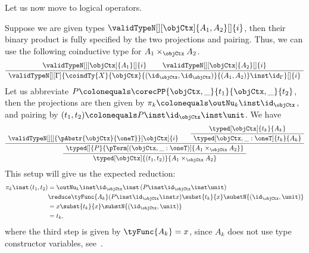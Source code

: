 \documentclass[preprint]{sigplanconf}
\begin{document}
Let us now move to logical operators.
\begin{example}
  Suppose we are given types $\validTypeN[][\objCtx]{A_1, A_2}[]{i}$,
  then their binary product is fully specified by the two projections and
  pairing.
  Thus, we can use the following coinductive type for
  $A_1 \times_{\objCtx} A_2$.
  \begin{gather*}
    \AxiomC{$\validTypeN[][\objCtx]{A_1}[]{i}$}
    \AxiomC{$\validTypeN[][\objCtx]{A_2}[]{i}$}
    \BinaryInfC{$\validTypeN[][\Gamma]{
        \coindTy{X}{\objCtx}{(\id_\objCtx, \id_\objCtx)}{(A_1, A_2)}
        \inst \id_{\Gamma}
      }[]{i}$}
    \DisplayProof
  \end{gather*}
  Let us abbreviate
  $P \colonequals \corecPP{\objCtx, \_}{t_1}{\objCtx, \_}{t_2}$,
  then the projections are then given by
  $\pi_k \colonequals \outNu_k \inst \id_\objCtx$, and
  pairing by
  $(t_1, t_2) \colonequals P \inst \id_{\objCtx} \inst \unit$.
  We have
  \begin{equation*}
    \AxiomC{$\validTypeN[][]{\pAbstr{\objCtx}{\oneT}}[\objCtx]{i}$}
    \AxiomC{$\typed[\objCtx]{t_k}{A_k}$}
    \UnaryInfC{$\typed[\objCtx, \_ : \oneT]{t_k}{A_k}$}
    \BinaryInfC{$
      \typed[]{P}
      {\pTerm[(\objCtx, \_ : \oneT)]{A_1 \times_\objCtx A_2}}$}
    \UnaryInfC{$\typed[\objCtx]{(t_1, t_2)}{A_1 \times_\objCtx A_2}$}
    \DisplayProof
  \end{equation*}
  This setup will give us the expected reduction:
  \begin{align*}
    \pi_k \inst \, (t_1, t_2)
    & = \outNu_k \inst \id_\objCtx
    \inst \, (P \inst \id_{\objCtx} \inst \unit) \\
    & \reduce \tyFunc{A_k}(P \inst \id_{\objCtx} \inst x)
    \subst{t_k}{x} \substN{(\id_\objCtx, \unit)} \\
    & = x \subst{t_k}{x} \substN{(\id_\objCtx, \unit)} \\
    & = t_k,
  \end{align*}
  where the third step is given by $\tyFunc{A_k} = x$,
  since $A_k$ does not use type constructor variables,
  see~.


\end{example}
\end{document}
